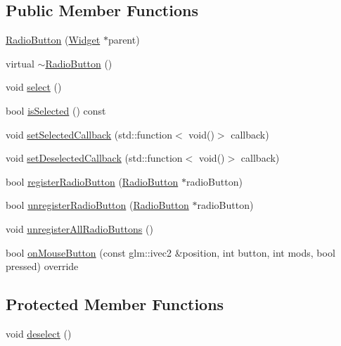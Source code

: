 \subsection*{Public Member Functions}
\begin{DoxyCompactItemize}
\item 
\mbox{\hyperlink{classec__gui_1_1_radio_button_a47767d326d721a4f754926f0a3ef5033}{Radio\+Button}} (\mbox{\hyperlink{classec__gui_1_1_widget}{Widget}} $\ast$parent)
\item 
virtual \mbox{\hyperlink{classec__gui_1_1_radio_button_afad4c8b1b6915e612f514b0710b1bcf0}{$\sim$\+Radio\+Button}} ()
\item 
void \mbox{\hyperlink{classec__gui_1_1_radio_button_a4ca8b671055af6c2fd0a70c8d0374e4e}{select}} ()
\item 
bool \mbox{\hyperlink{classec__gui_1_1_radio_button_ae957ec25f29430e229324e2f1fd40938}{is\+Selected}} () const
\item 
void \mbox{\hyperlink{classec__gui_1_1_radio_button_a79d37b72ef3eb9c87bcf434d35c0edb2}{set\+Selected\+Callback}} (std\+::function$<$ void()$>$ callback)
\item 
void \mbox{\hyperlink{classec__gui_1_1_radio_button_acfc091ef11bb80bbce389dad0db15c09}{set\+Deselected\+Callback}} (std\+::function$<$ void()$>$ callback)
\item 
bool \mbox{\hyperlink{classec__gui_1_1_radio_button_a7d5178b89e3939f09e8a772203962b23}{register\+Radio\+Button}} (\mbox{\hyperlink{classec__gui_1_1_radio_button}{Radio\+Button}} $\ast$radio\+Button)
\item 
bool \mbox{\hyperlink{classec__gui_1_1_radio_button_ab8cb0615df1c6a3a7206334c911a0eba}{unregister\+Radio\+Button}} (\mbox{\hyperlink{classec__gui_1_1_radio_button}{Radio\+Button}} $\ast$radio\+Button)
\item 
void \mbox{\hyperlink{classec__gui_1_1_radio_button_ab4d7242236d1d7fffe121e5c784e717a}{unregister\+All\+Radio\+Buttons}} ()
\item 
bool \mbox{\hyperlink{classec__gui_1_1_radio_button_a1292737d957e5cd5ff445bb43ea6911c}{on\+Mouse\+Button}} (const glm\+::ivec2 \&position, int button, int mods, bool pressed) override
\end{DoxyCompactItemize}
\subsection*{Protected Member Functions}
\begin{DoxyCompactItemize}
\item 
void \mbox{\hyperlink{classec__gui_1_1_radio_button_ab39e334f994ea9a23fa5adab476fe3f1}{deselect}} ()
\end{DoxyCompactItemize}
